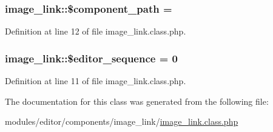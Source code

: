 \subsubsection[{\$component\+\_\+path}]{\setlength{\rightskip}{0pt plus 5cm}image\+\_\+link\+::\$component\+\_\+path = \textquotesingle{}\textquotesingle{}}\label{classimage__link_ae68f572cbf4ce0aaa8ac20dd6b98a2f0}


Definition at line 12 of file image\+\_\+link.\+class.\+php.

\hypertarget{classimage__link_af783692826f89b17fa6e9cf21d4f0f8b}{}
\subsubsection[{\$editor\+\_\+sequence}]{\setlength{\rightskip}{0pt plus 5cm}image\+\_\+link\+::\$editor\+\_\+sequence = 0}\label{classimage__link_af783692826f89b17fa6e9cf21d4f0f8b}


Definition at line 11 of file image\+\_\+link.\+class.\+php.



The documentation for this class was generated from the following file\+:\begin{DoxyCompactItemize}
\item 
modules/editor/components/image\+\_\+link/\hyperlink{image__link_8class_8php}{image\+\_\+link.\+class.\+php}\end{DoxyCompactItemize}
